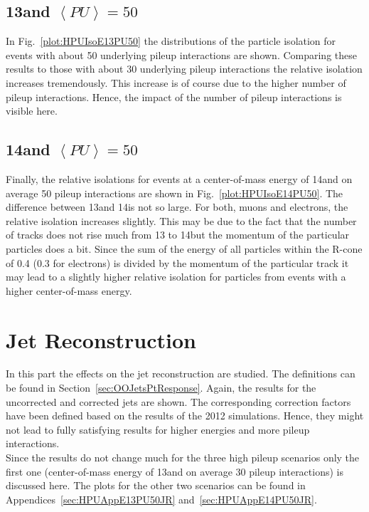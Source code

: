\subsection{13\TeV and $\left<PU\right>=50$ \label{sec:HPUIsoE13PU50}}

In Fig.~\ref{plot:HPUIsoE13PU50} the distributions of the particle isolation for events with about 50 underlying pileup interactions are shown. Comparing these results to those with about 30 underlying pileup interactions the relative isolation increases tremendously. This increase is of course due to the higher number of pileup interactions. Hence, the impact of the number of pileup interactions is visible here.

\subsection{14\TeV and $\left<PU\right>=50$ \label{sec:HPUIsoE14PU50}}

Finally, the relative isolations for events at a center-of-mass energy of 14\TeV and on average 50 pileup interactions are shown in Fig.~\ref{plot:HPUIsoE14PU50}. The difference between 13\TeV and 14\TeV is not so large. For both, muons and electrons, the relative isolation increases slightly. This may be due to the fact that the number of tracks does not rise much from 13 to 14\TeV but the momentum of the particular particles does a bit. Since the sum of the energy of all particles within the R-cone of 0.4 (0.3 for electrons) is divided by the momentum of the particular track it may lead to a slightly higher relative isolation for particles from events with a higher center-of-mass energy.

\section{Jet Reconstruction \label{sec:HPUJet}}

In this part the effects on the jet reconstruction are studied. The definitions can be found in Section~\ref{sec:OOJetsPtResponse}. Again, the results for the uncorrected and corrected jets are shown. The corresponding correction factors have been defined based on the results of the 2012 simulations. Hence, they might not lead to fully satisfying results for higher energies and more pileup interactions. \\
Since the results do not change much for the three high pileup scenarios only the first one (center-of-mass energy of 13\TeV and on average 30 pileup interactions) is discussed here. The plots for the other two scenarios can be found in Appendices~\ref{sec:HPUAppE13PU50JR} and~\ref{sec:HPUAppE14PU50JR}.

